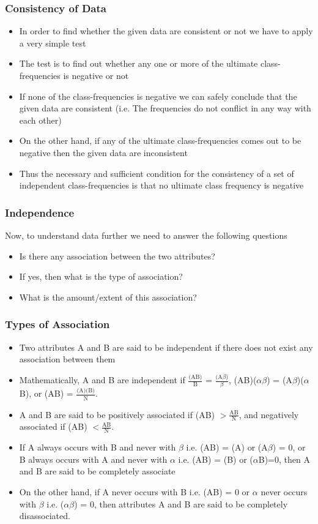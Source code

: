 \documentclass[
10pt, %
a4paper, %
]{report}
\begin{document}
\subsubsection*{Consistency of Data}
\begin{itemize}
\item In order to find whether the given data are consistent or not we have to apply a very simple test
\item The test is to find out whether any one or more of the ultimate
class-frequencies is negative or not
\item If none of the class-frequencies is negative we can safely conclude that the given data are consistent (i.e. The frequencies do not conflict in any way with each other)
\item On the other hand, if any of the ultimate class-frequencies comes out to be negative then the given data are inconsistent
\item Thus the necessary and sufficient condition for the consistency of a set of independent class-frequencies is that no ultimate class frequency is negative
\end{itemize}

\subsubsection*{Independence}
Now, to understand data further we need to answer the following questions
\begin{itemize}
\item Is there any association between the two attributes?
\item If yes, then what is the type of association?
\item What is the amount/extent of this association?
\end{itemize}

\subsubsection*{Types of Association}
\begin{itemize}
\item Two attributes A and B are said to be independent if there does not exist any association between them
\item Mathematically, A and B are independent if \(\frac{\text{(AB)}}{\text{B}}\) = \(\frac{\text{(A}\beta)}{\beta}\), (AB)(\(\alpha\beta\)) = (A\(\beta\))(\(\alpha\)B), or (AB) = \(\frac{\text{(A)(B)}}{\text{N}}\).
\item A and B are said to be positively associated if (AB) \(> \frac{\text{AB}}{\text{N}}\), and negatively associated if (AB) \(< \frac{\text{AB}}{\text{N}}\).
\item If A always occurs with B and never with \(\beta\) i.e. (AB) = (A) or (A\(\beta\)) = 0, or B always occurs with A and never with \(\alpha\) i.e. (AB) = (B) or (\(\alpha\)B)=0, then A and B are said to be completely associate
\item On the other hand, if A never occurs with B i.e. (AB) = 0 or \(\alpha\) never occurs with \(\beta\) i.e. (\(\alpha\beta\)) = 0, then attributes A and B are said to be completely disassociated.
\end{itemize}
\end{document}
